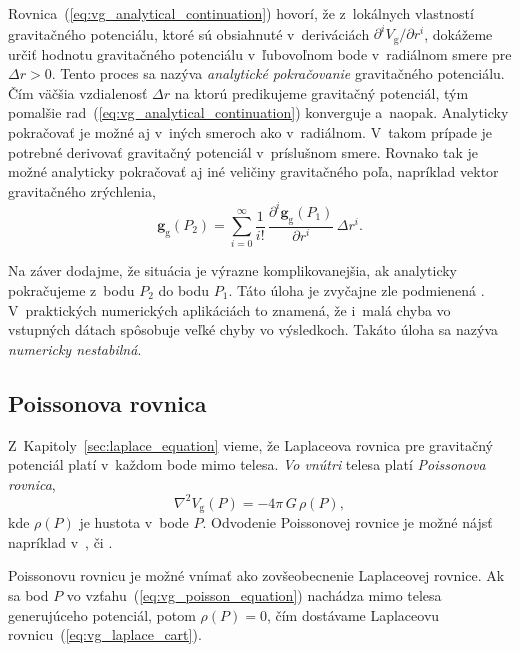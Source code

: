 \documentclass[a4paper, 12pt]{book}
\newcommand{\gidx}{\mathrm g}
\let\vec\mathbf
\begin{document}
Rovnica~(\ref{eq:vg_analytical_continuation}) hovorí, že z~lokálnych vlastností 
gravitačného potenciálu, ktoré sú obsiahnuté v~deriváciách $\partial^i V_\gidx 
\slash \partial r^i$, dokážeme určiť hodnotu gravitačného potenciálu 
v~ľubovoľnom bode v~radiálnom smere pre $\Delta r > 0$.  Tento proces sa nazýva 
\emph{analytické pokračovanie} gravitačného potenciálu.  Čím väčšia vzdialenosť 
$\Delta r$ na ktorú predikujeme gravitačný potenciál, tým pomalšie 
rad~(\ref{eq:vg_analytical_continuation}) konverguje a~naopak.  Analyticky 
pokračovať je možné aj v~iných smeroch ako v~radiálnom.  V~takom prípade je 
potrebné derivovať gravitačný potenciál v~príslušnom smere.  Rovnako tak je 
možné analyticky pokračovať aj iné veličiny gravitačného poľa, napríklad vektor 
gravitačného zrýchlenia,
%
\begin{equation}
\vec g_\gidx(P_2) = \sum_{i = 0}^{\infty} \frac{1}{i!} \, \frac{\partial^i \vec 
g_\gidx(P_1)}{\partial r^i} \, \Delta r^i{.}
\end{equation}

Na záver dodajme, že situácia je výrazne komplikovanejšia, ak analyticky 
pokračujeme z~bodu $P_2$ do bodu $P_1$.  Táto úloha je zvyčajne zle podmienená 
\citep{SansoGeodeticBoundaryValueProblem}.  V~praktických numerických 
aplikáciách to znamená, že i~malá chyba vo vstupných dátach spôsobuje veľké 
chyby vo výsledkoch.  Takáto úloha sa nazýva \emph{numericky nestabilná}.  






\subsection{Poissonova rovnica}
\label{sec:poisson_equation}

Z~Kapitoly~\ref{sec:laplace_equation} vieme, že Laplaceova rovnica pre 
gravitačný potenciál platí v~každom bode mimo telesa.  \emph{Vo vnútri} telesa 
platí \emph{Poissonova rovnica},
%
\begin{equation}
\label{eq:vg_poisson_equation}
\nabla^2 V_\gidx(P) = -4 \pi \, G \, \rho(P){,}
\end{equation}
%
kde $\rho(P)$ je hustota v~bode $P$.  Odvodenie Poissonovej rovnice je možné 
nájsť napríklad v~\cite{MacMillan1930}, \cite{Kellogg1967} či 
\cite{SansoGeoidDetermination}.

Poissonovu rovnicu je možné vnímať ako zovšeobecnenie Laplaceovej rovnice.  Ak 
sa bod $P$ vo vzťahu~(\ref{eq:vg_poisson_equation}) nachádza mimo telesa 
generujúceho potenciál, potom $\rho(P) = 0$, čím dostávame Laplaceovu 
rovnicu~(\ref{eq:vg_laplace_cart}).
\end{document}
